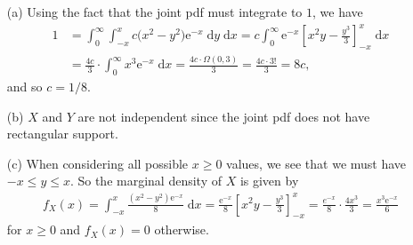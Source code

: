 \documentclass[10pt]{article}
\begin{document}
\begin{itemize}
    \item[(a)] 
    Using the fact that the joint pdf must integrate to \(1\), we have 
    \begin{align*}
        1 &= \int_0^{\infty} \int_{-x}^{x} c \big( x^2 - y^2 \big) \mathrm{e}^{-x} \;\mathrm{d}y \;\mathrm{d}x
        = c \int_0^{\infty} \mathrm{e}^{-x} \left[ x^2y - \frac{y^3}{3} \right]_{-x}^{x} \;\mathrm{d}x \\
        &= \frac{4c}{3} \cdot \int_0^{\infty} x^3 \mathrm{e}^{-x} \;\mathrm{d}x
        = \frac{4c \cdot \Omega(0,3)}{3} 
        = \frac{4c \cdot 3!}{3}
        = 8 c,
    \end{align*}
    and so \(c = 1/8\). 
    \item[(b)] \(X\) and \(Y\) are not independent since the joint pdf does not have rectangular support. 
    \item[(c)] 
    When considering all possible \(x \ge 0\) values, we see that we must have \(-x \le y \le x\). 
    So the marginal density of \(X\) is given by 
    \begin{align*}
        f_X(x) = \int_{-x}^x \frac{(x^2 - y^2)\mathrm{e}^{-x}}{8} \;\mathrm{d}x
        = \frac{\mathrm{e}^{-x}}{8} \left[ x^2y - \frac{y^3}{3} \right]_{-x}^x
        = \frac{e^{-x}}{8} \cdot \frac{4 x^3}{3}
        = \frac{x^3 \mathrm{e}^{-x}}{6}
    \end{align*}
    for \(x \ge 0\) and \(f_X(x) = 0\) otherwise.

\end{itemize}
\end{document}
